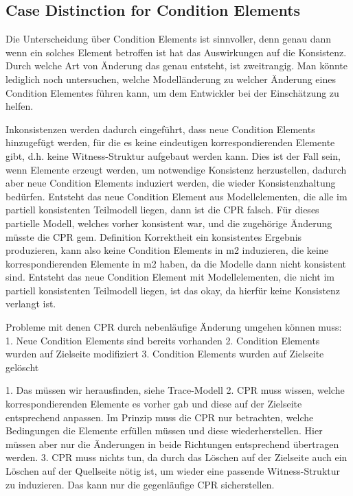 \subsection{Case Distinction for Condition Elements}
Die Unterscheidung über Condition Elements ist sinnvoller, denn genau dann wenn ein solches Element betroffen ist hat das Auswirkungen auf die Konsistenz. Durch welche Art von Änderung das genau entsteht, ist zweitrangig. Man könnte lediglich noch untersuchen, welche Modelländerung zu welcher Änderung eines Condition Elementes führen kann, um dem Entwickler bei der Einschätzung zu helfen.

Inkonsistenzen werden dadurch eingeführt, dass neue Condition Elements hinzugefügt werden, für die es keine eindeutigen korrespondierenden Elemente gibt, d.h. keine Witness-Struktur aufgebaut werden kann.
Dies ist der Fall sein, wenn Elemente erzeugt werden, um notwendige Konsistenz herzustellen, dadurch aber neue Condition Elements induziert werden, die wieder Konsistenzhaltung bedürfen.
Entsteht das neue Condition Element aus Modellelementen, die alle im partiell konsistenten Teilmodell liegen, dann ist die CPR falsch.
Für dieses partielle Modell, welches vorher konsistent war, und die zugehörige Änderung müsste die CPR gem. Definition Korrektheit ein konsistentes Ergebnis produzieren, kann also keine Condition Elements in m2 induzieren, die keine korrespondierenden Elemente in m2 haben, da die Modelle dann nicht konsistent sind.
Entsteht das neue Condition Element mit Modellelementen, die nicht im partiell konsistenten Teilmodell liegen, ist das okay, da hierfür keine Konsistenz verlangt ist.

Probleme mit denen CPR durch nebenläufige Änderung umgehen können muss:
1. Neue Condition Elements sind bereits vorhanden
2. Condition Elements wurden auf Zielseite modifiziert
3. Condition Elements wurden auf Zielseite gelöscht

1. Das müssen wir herausfinden, siehe Trace-Modell
2. CPR muss wissen, welche korrespondierenden Elemente es vorher gab und diese auf der Zielseite entsprechend anpassen. Im Prinzip muss die CPR nur betrachten, welche Bedingungen die Elemente erfüllen müssen und diese wiederherstellen. Hier müssen aber nur die Änderungen in beide Richtungen entsprechend übertragen werden.
3. CPR muss nichts tun, da durch das Löschen auf der Zielseite auch ein Löschen auf der Quellseite nötig ist, um wieder eine passende Witness-Struktur zu induzieren. Das kann nur die gegenläufige CPR sicherstellen.

